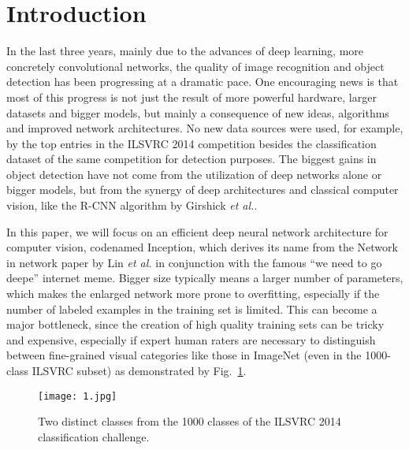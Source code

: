 \documentclass[10pt,twocolumn,letterpaper]{article}
\begin{document}
\section{Introduction}
In the last three years, mainly due to the advances of deep learning, more concretely convolutional networks, the quality of image recognition and object detection has been progressing at a dramatic pace. One encouraging news is that most of this progress is not just the result of more powerful hardware, larger datasets and bigger models, but mainly a consequence of new ideas, algorithms and improved network architectures. No new data sources were used, for example, by the top entries in the ILSVRC 2014 competition besides the classification dataset of the same competition for detection purposes.	The biggest gains in object detection have not come from the utilization of deep networks alone or bigger models, but from the synergy of deep architectures and classical computer vision, like the R-CNN algorithm by Girshick \emph{et al.}\cite{Krizhevsky2012ImageNet}.
\par
In this paper, we will focus on an efficient deep neural network architecture for computer vision, codenamed Inception, which derives its name from the Network in network paper by Lin \emph{et al.}\cite{Dean2012Large} in conjunction with the famous ``we need to go deepe'' internet meme. Bigger size typically means a larger number of parameters, which makes the enlarged network more prone to overfitting,  especially if the number of labeled examples in the training set is limited. This can become a major bottleneck, since the creation of high quality training sets can be tricky and expensive, especially if expert human raters are necessary to distinguish between fine-grained visual categories like those in ImageNet (even in the 1000-class ILSVRC subset) as demonstrated by Fig.~\ref{1}.
\begin{figure}
\begin{center}
  \texttt{[image: 1.jpg]}\\
  \caption{Two distinct classes from the 1000 classes of the ILSVRC 2014 classification challenge.}\label{1}
\end{center}
\end{figure}
\end{document}
